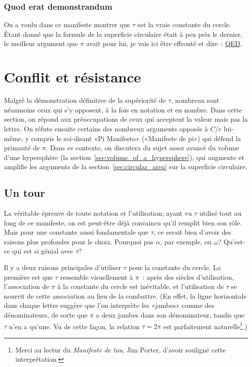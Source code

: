     \subsubsection{Quod erat demonstrandum} %
    \label{sec:quod_erat_demonstrandum}

On a voulu dans ce manifeste montrer que $\tau$ est la vraie constante du
cercle. Étant donné que la formule de la superficie circulaire était à peu près
le dernier, le meilleur argument que $\pi$ avait pour lui, je vais ici être
effronté et dire~:
\href{https://fr.wikipedia.org/wiki/CQFD_(math%C3%A9matiques)}{QED}.



\section{Conflit et résistance} %
\label{sec:conflict_and_resistance}

Malgré la démonstration définitive de la supériorité de $\tau$, nombreux sont
néanmoins ceux qui s'y opposent, à la fois en notation et en nombre. Dans cette
section, on répond aux préoccupations de ceux qui acceptent la valeur mais pas
la lettre. On réfute ensuite certains des nombreux arguments opposés à $C/r$
lui-même, y compris le soi-disant «\ns Pi Manifesto\ns » («\ns Manifeste de pi\ns ») qui
défend la primauté de $\pi$. Dans ce contexte, on discutera du sujet assez
avancé du volume d'une hypersphère (la
section~\ref{sec:volume_of_a_hypersphere}), qui augmente et amplifie les
arguments de la section~\ref{sec:circular_area} sur la superficie circulaire.

  \subsection{Un tour} %
  \label{sec:one_turn}

La véritable épreuve de toute notation et l'utilisation\ns; ayant vu $\tau$
utilisé tout au long de ce manifeste, on est peut-être déjà convaincu qu'il
remplit bien son rôle. Mais pour une constante aussi fondamentale que $\tau$, ce
serait bien d'avoir des raisons plus profondes pour le choix. Pourquoi pas
$\alpha$, par exemple, ou $\omega$\ns? Qu'est-ce qui est si génial avec $\tau$\ns?

Il y a deux raisons principales d'utiliser $\tau$ pour la constante du cercle.
La première est que $\tau$ ressemble visuellement à $\pi$~: après des siècles
d'utilisation, l'association de $\pi$ à la constante du cercle est inévitable,
et l'utilisation de $\tau$ se nourrit de cette association au lieu de la
combattre. (En effet, la ligne horizontale dans chaque lettre suggère que l'on
interprète les «\ns jambes\ns » comme des dénominateurs, de sorte que $\pi$ a deux
jambes dans son dénominateur, tandis que $\tau$ n'en a qu'une. Vu de cette
façon, la relation $\tau = 2\pi$ est parfaitement naturelle\ns\footnote{Merci au
lectur du \emph{Manifeste de tau}, Jim Porter, d'avoir souligné cette
interprétation.}.)

